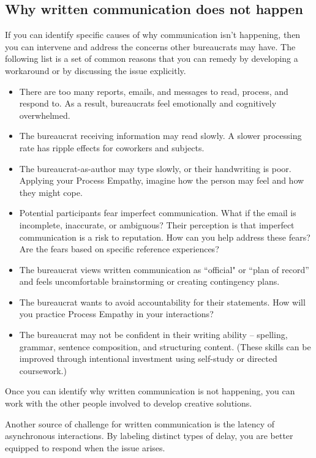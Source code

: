 \subsection*{Why written communication does not happen\label{sec:written-comm-does-not-happen}}
If you can identify specific causes of why communication isn't happening, then you can intervene and address the concerns other bureaucrats may have. The following list is a set of common reasons that you can remedy by developing a workaround or by discussing the issue explicitly. 
\begin{itemize}
    \item There are too many reports, emails, and messages to read, process, and respond to. As a result, bureaucrats feel emotionally and cognitively overwhelmed.
\item The bureaucrat receiving information may read slowly. A slower processing rate has ripple effects for coworkers and subjects.
\item The bureaucrat-as-author may type slowly, or their handwriting is poor. Applying your Process Empathy, imagine how the person may feel and how they might cope.
\item Potential participants fear imperfect communication. What if the email is incomplete, inaccurate, or ambiguous? Their perception is that imperfect communication is a risk to reputation. How can you help address these fears? Are the fears based on specific reference experiences?
\item The bureaucrat views written communication as ``official" or ``plan of record'' and feels uncomfortable brainstorming or creating contingency plans.
\item The bureaucrat wants to avoid accountability for their statements. How will you practice Process Empathy in your interactions?
\item The bureaucrat may not be confident in their writing ability -- spelling, grammar, sentence composition, and structuring content. (These skills can be improved through intentional investment using self-study or directed coursework.) %
\end{itemize}
Once you can identify why written communication is not happening, you can work with the other people involved to develop creative solutions. 

Another source of challenge for written communication is the latency of asynchronous interactions. By labeling distinct types of delay, you are better equipped to respond when the issue arises. 

